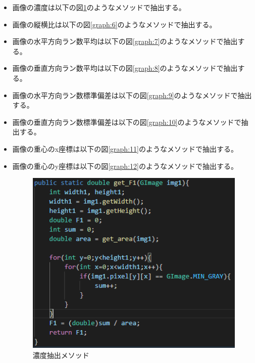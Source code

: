 \begin{enumerate}
\begin{itemize}
\begin{itemize}
      \item 画像の濃度は以下の図\ref{graph:5}のようなメソッドで抽出する。
      \item 画像の縦横比は以下の図\ref{graph:6}のようなメソッドで抽出する。
      \item 画像の水平方向ラン数平均は以下の図\ref{graph:7}のようなメソッドで抽出する。
      \item 画像の垂直方向ラン数平均は以下の図\ref{graph:8}のようなメソッドで抽出する。
      \item 画像の水平方向ラン数標準偏差は以下の図\ref{graph:9}のようなメソッドで抽出する。
      \item 画像の垂直方向ラン数標準偏差は以下の図\ref{graph:10}のようなメソッドで抽出する。
      \item 画像の重心のx座標は以下の図\ref{graph:11}のようなメソッドで抽出する。
      \item 画像の重心のy座標は以下の図\ref{graph:12}のようなメソッドで抽出する。
      \begin{figure}[htbp]
        \begin{minipage}[t]{0.45\hsize}
          \includegraphics[scale=0.5]{濃度抽出.PNG}
          \centering
          \caption{濃度抽出メソッド}
          \label{graph:5}
        \end{minipage}
        \begin{minipage}[t]{0.45\hsize}

\end{minipage}
\end{figure}
\end{itemize}
\end{itemize}
\end{enumerate}
